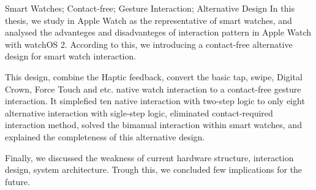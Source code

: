 
\begin{abstract}{智能手表；非接触式；手势交互；备择设计}
本文以现有智能手表产品的代表 Apple Watch 为例，对 Apple Watch 上的交互模式的优缺点进行了全面的分析，并据此给出了一套非接触式的备择设计。其配合了 Haptic Engine 对用户的直观震动反馈，完成了对基础点按、滑动、Digital Crown、Force Touch等系列原生交互的非接触式手势交互设计，此设计将嵌套两步逻辑的十种原生交互简化为了单步逻辑上的八种备择交互，且消除了接触式交互的依赖，解决了现有交互中对双手依赖的缺陷，并同时说明了给出的备择设计的交互完备性。最后，本文对设计的硬件结构、交互方式和系统架构的现有缺陷进行了讨论，并从中得到的启示，给出了可行的解决思路。
\end{abstract}

\begin{abstractEng}{Smart Watches; Contact-free; Gesture Interaction; Alternative Design}
In this thesis, we study in Apple Watch as the representative of smart watches, and analysed the advanteges and disadvanteges of interaction pattern in Apple Watch with watchOS 2. According to this, we introducing a contact-free alternative design for smart watch interaction.

This design, combine the Haptic feedback, convert the basic tap, swipe, Digital Crown, Force Touch and etc. native watch interaction to a contact-free gesture interaction. It simplefied ten native interaction with two-step logic to only eight alternative interaction with sigle-step logic, eliminated contact-required interaction method, solved the bimanual interaction within smart watches, and explained the completeness of this alternative design.

Finally, we discussed the weakness of current hardware structure, interaction design, system architecture. Trough this, we concluded few implications for the future.
\end{abstractEng}
